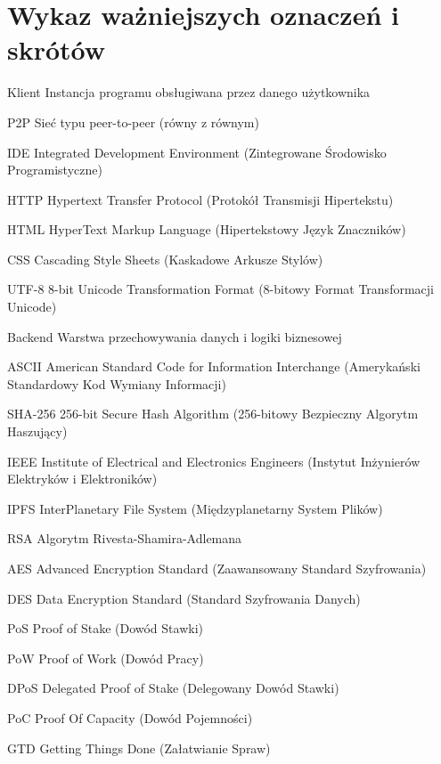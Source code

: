 \chapter*{Wykaz ważniejszych oznaczeń i skrótów}

\begin{abbrev}
\item[Klient] Instancja programu obsługiwana przez danego użytkownika
\item[P2P] Sieć typu peer-to-peer (równy z równym)
\item[IDE] Integrated Development Environment (Zintegrowane Środowisko Programistyczne)
\item[HTTP] Hypertext Transfer Protocol (Protokół Transmisji Hipertekstu)
\item[HTML] HyperText Markup Language (Hipertekstowy Język Znaczników)
\item[CSS] Cascading Style Sheets (Kaskadowe Arkusze Stylów)
\item[UTF-8] 8-bit Unicode Transformation Format (8-bitowy Format Transformacji Unicode)
\item[Backend] Warstwa przechowywania danych i logiki biznesowej
\item[ASCII] American Standard Code for Information Interchange (Amerykański Standardowy Kod Wymiany Informacji)
\item [SHA-256] 256-bit Secure Hash Algorithm (256-bitowy Bezpieczny Algorytm Haszujący)
\item[IEEE] Institute of Electrical and Electronics Engineers (Instytut Inżynierów Elektryków i Elektroników)
\item[IPFS] InterPlanetary File System (Międzyplanetarny System Plików)
\item[RSA] Algorytm Rivesta-Shamira-Adlemana
\item[AES] Advanced Encryption Standard (Zaawansowany Standard Szyfrowania)
\item[DES] Data Encryption Standard (Standard Szyfrowania Danych)
\item[PoS] Proof of Stake (Dowód Stawki)
\item[PoW] Proof of Work (Dowód Pracy)
\item[DPoS] Delegated Proof of Stake (Delegowany Dowód Stawki)
\item[PoC] Proof Of Capacity (Dowód Pojemności)
\item[GTD] Getting Things Done (Załatwianie Spraw)

\end{abbrev}
